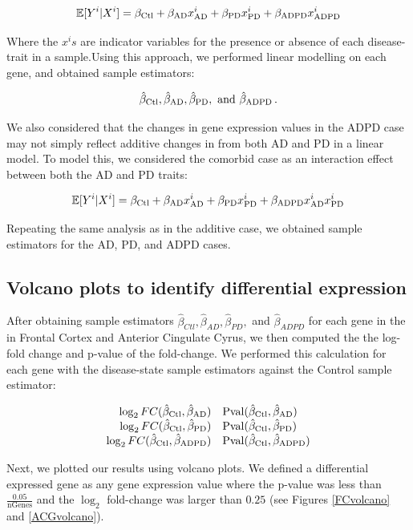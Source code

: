 \[  \mathbb{E}[Y^{i}|X^{i}] = \beta_{\operatorname{Ctl}} + \beta_{\operatorname{AD}}x_{\operatorname{AD}}^{i} + \beta_{\operatorname{PD}}x_{\operatorname{PD}}^{i} + \beta_{\operatorname{ADPD}}x_{\operatorname{ADPD}}^{i} \]

Where the $x^{i}s$ are indicator variables for the presence or absence of each disease-trait in a sample.Using this approach, we performed linear modelling on each gene, and obtained sample estimators:

 \[\hat{\beta}_{\operatorname{Ctl}}, \hat{\beta}_{\operatorname{AD}}, \hat{\beta}_{\operatorname{PD}}, \text{ and } \hat{\beta}_{\operatorname{ADPD}} \,.\] 

We also considered that the changes in gene expression values in the ADPD case may not simply reflect additive changes in from both AD and PD in a linear model. To model this, we considered the comorbid case as an interaction effect between both the AD and PD traits:

\[ \mathbb{E}[Y^{i}|X^{i}] = \beta_{\operatorname{Ctl}} + \beta_{\operatorname{AD}}x_{\operatorname{AD}}^{i} + \beta_{\operatorname{PD}}x_{\operatorname{PD}}^{i} + \beta_{\operatorname{ADPD}}x_{\operatorname{AD}}^{i}x_{\operatorname{PD}}^{i}  \]

Repeating the same analysis as in the additive case, we obtained sample estimators for the AD, PD, and ADPD cases.

\subsection{Volcano plots to identify differential expression}
\label{subsec:volc-plots-ident}

After obtaining sample estimators  $\hat{\beta}_{Ctl}, \hat{\beta}_{AD}, \hat{\beta}_{PD},$ and $\hat{\beta}_{ADPD}$ for each gene in the in Frontal Cortex and Anterior Cingulate Cyrus, we then computed the the log-fold change and p-value of the fold-change. We performed this calculation for each gene with the disease-state sample estimators against the Control sample estimator:

\[    \begin{array}{rl}  \log_{2}FC( \hat{\beta}_{\operatorname{Ctl}},\hat{\beta}_{\operatorname{AD}})	&	\operatorname{Pval} (\hat{ \beta}_{\operatorname{Ctl}},\hat{\beta}_{\operatorname{AD}}) \\  
 \log_{2}FC(\hat{ \beta}_{\operatorname{Ctl}},\hat{\beta}_{\operatorname{PD}})	&	\operatorname{Pval}(\hat{ \beta}_{\operatorname{Ctl}},\hat{\beta}_{\operatorname{PD}}) \\  
 \log_{2}FC( \hat{\beta}_{\operatorname{Ctl}},\hat{\beta}_{\operatorname{ADPD}})   &		\operatorname{Pval}(\hat{ \beta}_{\operatorname{Ctl}},\hat{\beta}_{\operatorname{ADPD}}) \\   \end{array}  \]

Next, we plotted our results using volcano plots. We defined a differential expressed gene as any gene expression value where the p-value was less than $\frac{0.05}{\operatorname{nGenes}}$ and the $\log_{2}$ fold-change was larger than $0.25$ (see Figures \ref{FCvolcano} and \ref{ACGvolcano}).

